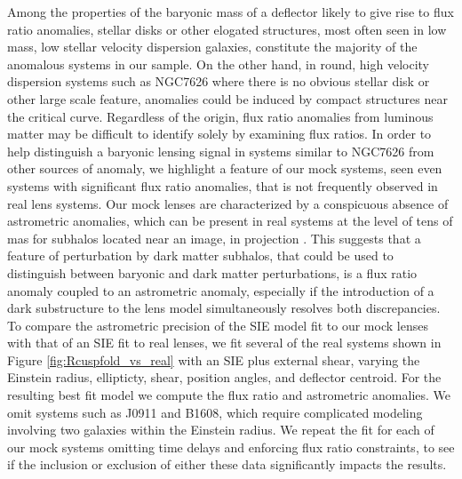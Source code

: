 Among the properties of the baryonic mass of a deflector likely to give rise to flux ratio anomalies, stellar disks or other elogated structures, most often seen in low mass, low stellar velocity dispersion galaxies, constitute the majority of the anomalous systems in our sample. On the other hand, in round, high velocity dispersion systems such as NGC7626 where there is no obvious stellar disk or other large scale feature, anomalies could be induced by compact structures near the critical curve. Regardless of the origin, flux ratio anomalies from luminous matter may be difficult to identify solely by examining flux ratios.
\newline \indent In order to help distinguish a baryonic lensing signal in systems similar to NGC7626 from other sources of anomaly, we highlight a feature of our mock systems, seen even systems with significant flux ratio anomalies, that is not frequently observed in real lens systems. Our mock lenses are characterized by a conspicuous absence of astrometric anomalies, which can be present in real systems at the level of tens of mas for subhalos located near an image, in projection \cite{Chiba02,Chen++07}. This suggests that a feature of perturbation by dark matter subhalos, that could be used to distinguish between baryonic and dark matter perturbations, is a flux ratio anomaly coupled to an astrometric anomaly, especially if the introduction of a dark substructure to the lens model simultaneously resolves both discrepancies.   
\newline \indent To compare the astrometric precision of the SIE model fit to our mock lenses with that of an SIE fit to real  lenses, we fit several of the real systems shown in Figure \ref{fig:Rcuspfold_vs_real} with an SIE plus external shear, varying the Einstein radius, ellipticty, shear, position angles, and deflector centroid. For the resulting best fit model we compute the flux ratio and astrometric anomalies. We omit systems such as J0911 and B1608, which require complicated modeling involving two galaxies within the Einstein radius. We repeat the fit for each of our mock systems omitting time delays and enforcing flux ratio constraints, to see if the inclusion or exclusion of either these data significantly impacts the results.
